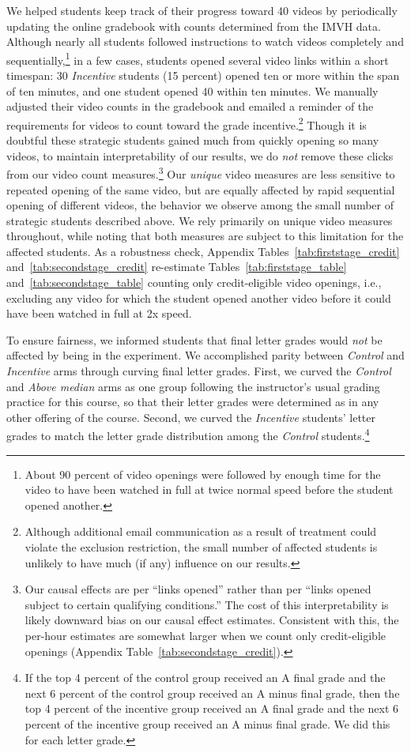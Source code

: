 We helped students keep track of their progress toward 40 videos by periodically updating the online gradebook with counts determined from the IMVH data.
Although nearly all students followed instructions to watch videos completely and sequentially,\footnote{About 90 percent of video openings were followed by enough time for the video to have been watched in full at twice normal speed before the student opened another.} in a few cases, students opened several video links within a short timespan: 30 \textit{Incentive} students (15 percent) opened ten or more within the span of ten minutes, and one student opened 40 within ten minutes.
We manually adjusted their video counts in the gradebook and emailed a reminder of the requirements for videos to count toward the grade incentive.\footnote{Although additional email communication as a result of treatment could violate the exclusion restriction, the small number of affected students is unlikely to have much (if any) influence on our results.}
Though it is doubtful these strategic students gained much from quickly opening so many videos, to maintain interpretability of our results, we do \textit{not} remove these clicks from our video count measures.\footnote{Our causal effects are per ``links opened'' rather than per ``links opened subject to certain qualifying conditions.''
	The cost of this interpretability is likely downward bias on our causal effect estimates.
    Consistent with this, the per-hour estimates are somewhat larger when we count only credit-eligible openings (Appendix Table~\ref{tab:secondstage_credit}).
}
Our \textit{unique} video measures are less sensitive to repeated opening of the same video, but are equally affected by rapid sequential opening of different videos, the behavior we observe among the small number of strategic students described above.
We rely primarily on unique video measures throughout, while noting that both measures are subject to this limitation for the affected students.
As a robustness check, Appendix Tables~\ref{tab:firststage_credit} and~\ref{tab:secondstage_credit} re-estimate Tables~\ref{tab:firststage_table} and~\ref{tab:secondstage_table} counting only credit-eligible video openings, i.e., excluding any video for which the student opened another video before it could have been watched in full at 2x speed.

To ensure fairness, we informed students that final letter grades would \textit{not} be affected by being in the experiment.
We accomplished parity between \textit{Control} and \textit{Incentive} arms through curving final letter grades.
First, we curved the \textit{Control} and \textit{Above median} arms as one group following the instructor's usual grading practice for this course, so that their letter grades were determined as in any other offering of the course.
Second, we curved the \textit{Incentive} students' letter grades to match the letter grade distribution among the \textit{Control} students.\footnote{If the top 4 percent of the control group received an A final grade and the next 6 percent of the control group received an A minus final grade, then the top 4 percent of the incentive group received an A final grade and the next 6 percent of the incentive group received an A minus final grade.
	We did this for each letter grade.
}

